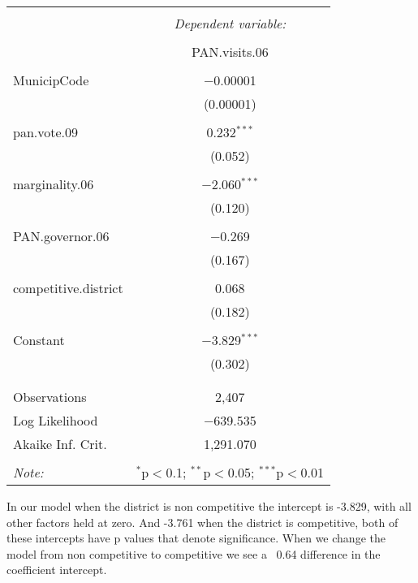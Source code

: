 \documentclass[12pt,letterpaper]{article}
\begin{document}
\begin{enumerate}
\begin{table}[!htbp] \centering 
	\caption{} 
	\label{} 
	\begin{tabular}{@{\extracolsep{5pt}}lc} 
		\\[-1.8ex]\hline 
		\hline \\[-1.8ex] 
		& \multicolumn{1}{c}{\textit{Dependent variable:}} \\ 
		\cline{2-2} 
		\\[-1.8ex] & PAN.visits.06 \\ 
		\hline \\[-1.8ex] 
		MunicipCode & $-$0.00001 \\ 
		& (0.00001) \\ 
		& \\ 
		pan.vote.09 & 0.232$^{***}$ \\ 
		& (0.052) \\ 
		& \\ 
		marginality.06 & $-$2.060$^{***}$ \\ 
		& (0.120) \\ 
		& \\ 
		PAN.governor.06 & $-$0.269 \\ 
		& (0.167) \\ 
		& \\ 
		competitive.district & 0.068 \\ 
		& (0.182) \\ 
		& \\ 
		Constant & $-$3.829$^{***}$ \\ 
		& (0.302) \\ 
		& \\ 
		\hline \\[-1.8ex] 
		Observations & 2,407 \\ 
		Log Likelihood & $-$639.535 \\ 
		Akaike Inf. Crit. & 1,291.070 \\ 
		\hline 
		\hline \\[-1.8ex] 
		\textit{Note:}  & \multicolumn{1}{r}{$^{*}$p$<$0.1; $^{**}$p$<$0.05; $^{***}$p$<$0.01} \\ 
	\end{tabular} 
\end{table} 

In our model when the district is non competitive the intercept is -3.829, with all other factors held at zero. And -3.761 when the district is competitive, both of these intercepts have p values that denote significance. When we change the model from non competitive to competitive we see a ~0.64 difference in the coefficient intercept. 


\end{enumerate}
\end{document}
